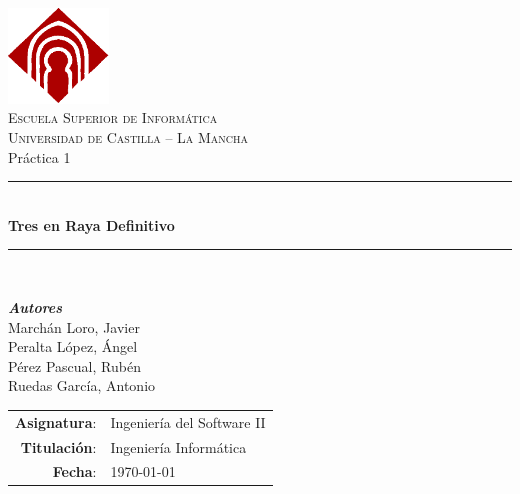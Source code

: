 \documentclass[a4paper,11pt,oneside]{article}
\begin{document}


\begin{titlepage}
\begin{center}

\includegraphics[width=0.2\textwidth]{img/logo-uclm.png}\\[1cm]
\textsc{\LARGE Escuela Superior de Informática}\\[0.5cm]
\textsc{\Large Universidad de Castilla -- La Mancha}\\[2.5cm]

{\LARGE Práctica 1}\\[0.5cm]
\rule{\linewidth}{0.5mm}\\[0.4cm]
{\huge \textbf{Tres en Raya Definitivo}}\\
\rule{\linewidth}{0.5mm}\\[0.4cm]

\begin{minipage}{0.5\textwidth}
\begin{flushleft}
\large
\hspace{1cm}\textbf{\emph{Autores}}\\
Marchán Loro, Javier\\
Peralta López, Ángel\\
Pérez Pascual, Rubén\\
Ruedas García, Antonio\\
\end{flushleft}
\end{minipage}
\vfill

\begin{minipage}{\textwidth}
\large
\begin{tabular}{rl}
\textbf{Asignatura}: & Ingeniería del Software II\\
\textbf{Titulación}: & Ingeniería Informática\\
\textbf{Fecha}: & \today
\end{tabular}
\end{minipage}

\end{center}
\end{titlepage}
\end{document}
